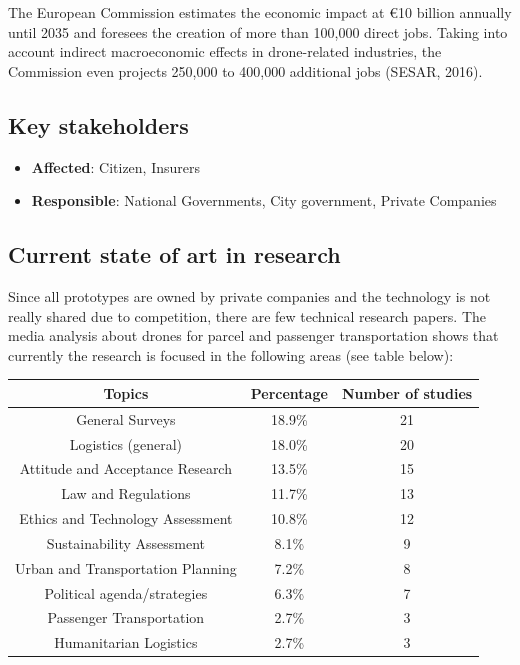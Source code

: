 \documentclass[
]{book}
\providecommand{\tightlist}{%
  \setlength{\itemsep}{0pt}\setlength{\parskip}{0pt}}
\begin{document}
The European Commission estimates the economic impact at €10 billion annually until 2035 and foresees the creation of more than 100,000 direct jobs. Taking into account indirect macroeconomic effects in drone-related industries, the Commission even projects 250,000 to 400,000 additional jobs (SESAR, 2016).

\hypertarget{key-stakeholders-9}{%
\subsection*{Key stakeholders}\label{key-stakeholders-9}}

\begin{itemize}
\tightlist
\item
  \textbf{Affected}: Citizen, Insurers
\item
  \textbf{Responsible}: National Governments, City government, Private Companies
\end{itemize}

\hypertarget{current-state-of-art-in-research-9}{%
\subsection*{Current state of art in research}\label{current-state-of-art-in-research-9}}

Since all prototypes are owned by private companies and the technology is not really shared due to competition, there are few technical research papers.
The media analysis about drones for parcel and passenger transportation shows that currently the research is focused in the following areas (see table below):

\begin{longtable}[]{@{}ccc@{}}
\toprule
Topics & Percentage & Number of studies\tabularnewline
\midrule
\endhead
General Surveys & 18.9\% & 21\tabularnewline
Logistics (general) & 18.0\% & 20\tabularnewline
Attitude and Acceptance Research & 13.5\% & 15\tabularnewline
Law and Regulations & 11.7\% & 13\tabularnewline
Ethics and Technology Assessment & 10.8\% & 12\tabularnewline
Sustainability Assessment & 8.1\% & 9\tabularnewline
Urban and Transportation Planning & 7.2\% & 8\tabularnewline
Political agenda/strategies & 6.3\% & 7\tabularnewline
Passenger Transportation & 2.7\% & 3\tabularnewline
Humanitarian Logistics & 2.7\% & 3\tabularnewline
\bottomrule
\end{longtable}
\end{document}
